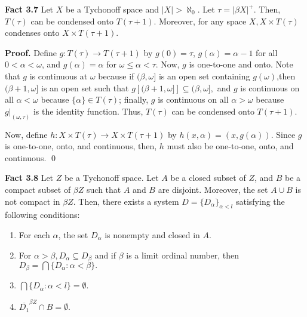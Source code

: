 \documentclass{article}
\begin{document}
			  \vskip 30pt

			  \textbf{Fact 3.7} Let $X$ be a Tychonoff space and $|X|>\aleph_0$. Let $\tau=|\beta X|^+$. Then, $T(\tau)$ can be condensed onto $T(\tau+1).$ Moreover, for any space $X, X\times T(\tau)$ condenses onto $X\times T(\tau+1).$

			  \vskip 15pt

			  \textbf{Proof.} Define $g:T(\tau) \rightarrow T(\tau+1)$ by $g(0)=\tau$, $g(\alpha)=\alpha-1$ for all $0<\alpha<\omega$, and $g(\alpha)=\alpha$ for $\omega\leq \alpha <\tau$. Now, $g$ is one-to-one and onto. Note that $g$ is continuous at $\omega$ because if $(\beta, \omega]$ is an open set containing $g(\omega)$,then $(\beta+1,\omega]$ is an open set such that $g\left[(\beta+1, \omega]\right] \subseteq (\beta, \omega],$ and $g$ is continuous on all $\alpha<\omega$ because $\{\alpha\} \in T(\tau)$; finally, $g$ is continuous on all $\alpha>\omega$ because $g|_{(\omega, \tau)}$ is the identity function. Thus, $T(\tau)$ can be condensed onto $T(\tau+1).$

					      \vskip 10pt


					      Now, define $h: X\times T(\tau)\rightarrow X\times T(\tau+1)$ by $h(x,\alpha)=(x,g(\alpha)).$ Since $g$ is one-to-one, onto, and continuous, then, $h$ must also be one-to-one, onto, and continuous. \qed


					      \vskip 40pt


					      \textbf{Fact 3.8} Let $Z$ be a Tychonoff space. Let $A$ be a closed subset of $Z$,  and $B$ be a compact subset of $\beta Z$ such that $A$ and $B$ are disjoint. Moreover, the set $A\cup B$ is not compact in $\beta Z$. 
					      Then, there exists a system $D=\{D_\alpha\}_{\alpha<l}$ satisfying the following conditions:
					      \begin{enumerate}
					      \item For each $  \alpha  $, the set $ D_\alpha  $ is nonempty and closed in $A$.
					      \item For $ \alpha>\beta, D_\alpha \subseteq D_\beta  $ and if $  \beta $ is a limit ordinal number, then\\$  D_\beta=\bigcap \{D_\alpha:\alpha <\beta\}.$
					      \item $ \bigcap\{D_\alpha: \alpha<l\}=\emptyset . $
					      \item $\overline{D_1}^{\beta Z}\cap B =\emptyset.$

					      \end{enumerate}
\end{document}
